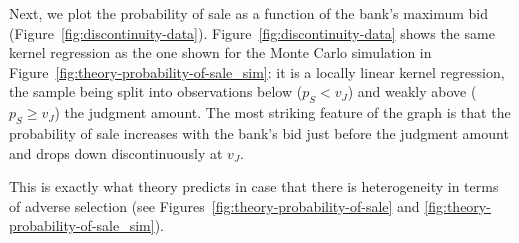 \documentclass[11pt,twopage]{article}
\begin{document}
Next, we plot the probability of sale as a function of the bank's
maximum bid
(Figure~\ref{fig:discontinuity-data}). Figure~\ref{fig:discontinuity-data}
shows the same kernel regression as the one shown for the Monte Carlo
simulation in Figure~\ref{fig:theory-probability-of-sale_sim}: it is a
locally linear kernel regression, the sample being split into
observations below ($p_S<v_J$) and weakly above ($p_S\geq v_J$) the
judgment amount. The most striking feature of the graph is that the
probability of sale increases with the bank's bid just before the
judgment amount and drops down discontinuously at $v_J$.


This is exactly what theory predicts in case that there is
heterogeneity in terms of adverse selection (see
Figures~\ref{fig:theory-probability-of-sale} and
\ref{fig:theory-probability-of-sale_sim}).


\end{document}
